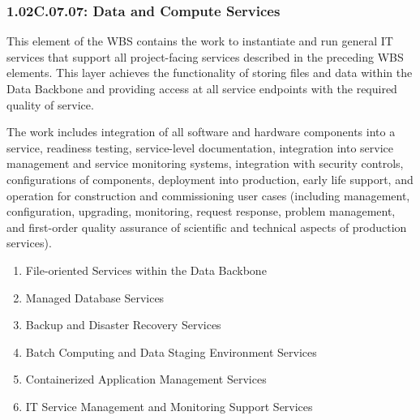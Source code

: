 \subsubsection*{1.02C.07.07: Data and Compute Services}

This element of the WBS contains the work to instantiate and run general IT services that support all project-facing services described in the preceding WBS elements.
This layer achieves the functionality of storing files and data within the Data Backbone and providing access at all service endpoints with the required quality of service.

The work includes integration of all software and hardware components into a service, readiness testing, service-level documentation, integration into service management and service monitoring systems, integration with security controls, configurations of components, deployment into production, early life support, and operation for construction and commissioning user cases (including management, configuration, upgrading, monitoring, request response, problem management, and first-order quality assurance of scientific and technical aspects of production services).

\begin{enumerate}

  \item{File-oriented Services within the Data Backbone}
  \item{Managed Database Services}
  \item{Backup and Disaster Recovery Services}
  \item{Batch Computing and Data Staging Environment Services}
  \item{Containerized Application Management Services}
  \item{IT Service Management and Monitoring Support Services}

\end{enumerate}

